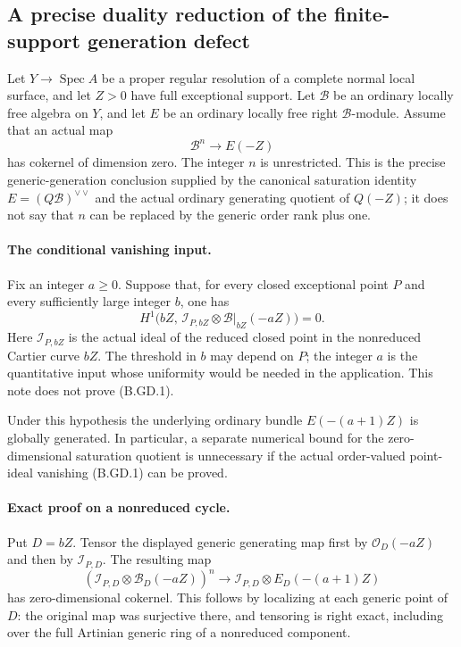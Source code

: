 \subsection*{A precise duality reduction of the finite-support generation defect}

Let $Y\to\operatorname{Spec}A$ be a proper regular resolution of a complete
normal local surface, and let $Z>0$ have full exceptional support.  Let
$\mathcal B$ be an ordinary locally free algebra on $Y$, and let $E$ be an
ordinary locally free right $\mathcal B$-module.  Assume that an actual map
\[
             \mathcal B^{n}\longrightarrow E(-Z)
\]
has cokernel of dimension zero.  The integer $n$ is unrestricted.  This is
the precise generic-generation conclusion supplied by the canonical
saturation identity $E=(Q\mathcal B)^{\vee\vee}$ and the actual ordinary
generating quotient of $Q(-Z)$; it does not say that $n$ can be replaced
by the generic order rank plus one.

\paragraph{The conditional vanishing input.}
Fix an integer $a\geq0$.  Suppose that, for every closed exceptional point
$P$ and every sufficiently large integer $b$, one has
\[
 H^1\bigl(bZ,\,\mathcal I_{P,bZ}\otimes
                    \mathcal B|_{bZ}(-aZ)\bigr)=0.       \tag{B.GD.1}
\]
Here $\mathcal I_{P,bZ}$ is the actual ideal of the reduced closed point
in the nonreduced Cartier curve $bZ$.  The threshold in $b$ may depend on
$P$; the integer $a$ is the quantitative input whose uniformity would be
needed in the application.  This note does not prove (B.GD.1).

Under this hypothesis the underlying ordinary bundle $E(-(a+1)Z)$ is
globally generated.  In particular, a separate numerical bound for the
zero-dimensional saturation quotient is unnecessary if the actual
order-valued point-ideal vanishing (B.GD.1) can be proved.

\paragraph{Exact proof on a nonreduced cycle.}
Put $D=bZ$.  Tensor the displayed generic generating map first by
$\mathcal O_D(-aZ)$ and then by $\mathcal I_{P,D}$.  The resulting map
\[
 (\mathcal I_{P,D}\otimes\mathcal B_D(-aZ))^n
       \longrightarrow
       \mathcal I_{P,D}\otimes E_D(-(a+1)Z)              \tag{B.GD.2}
\]
has zero-dimensional cokernel.  This follows by localizing at each
generic point of $D$: the original map was surjective there, and
tensoring is right exact, including over the full Artinian generic ring
of a nonreduced component.

